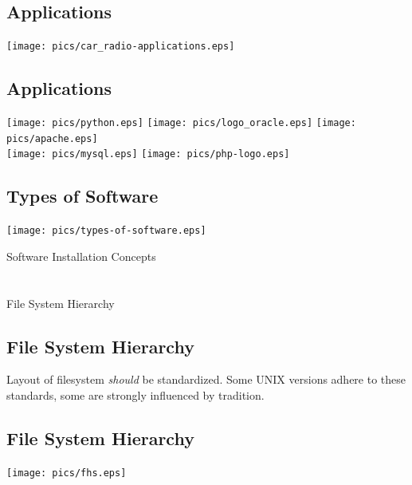 \documentclass[xga]{xdvislides}
\begin{document}
\subsection{Applications}
\begin{center}
	\texttt{[image: pics/car\_radio-applications.eps]}
\end{center}

\subsection{Applications}
\begin{center}
	\texttt{[image: pics/python.eps]}
	\texttt{[image: pics/logo\_oracle.eps]}
	\texttt{[image: pics/apache.eps]} \\
	\texttt{[image: pics/mysql.eps]}
	\texttt{[image: pics/php-logo.eps]}
\end{center}

\subsection{Types of Software}
\vfill
\begin{center}
	\texttt{[image: pics/types-of-software.eps]}
\end{center}
\vfill

\newpage
\vspace*{\fill}
\begin{center}
	\Hugesize
		Software Installation Concepts \\ [1em]
	\hspace*{5mm}
	\blueline\\
	\hspace*{5mm}\\
		File System Hierarchy
\end{center}
\vspace*{\fill}


\subsection{File System Hierarchy}
Layout of filesystem {\em should} be standardized.  Some UNIX versions adhere
to these standards, some are strongly influenced by tradition.

\subsection{File System Hierarchy}
\vspace*{\fill}
\begin{center}
	\texttt{[image: pics/fhs.eps]}
\end{center}
\vspace*{\fill}
\end{document}
